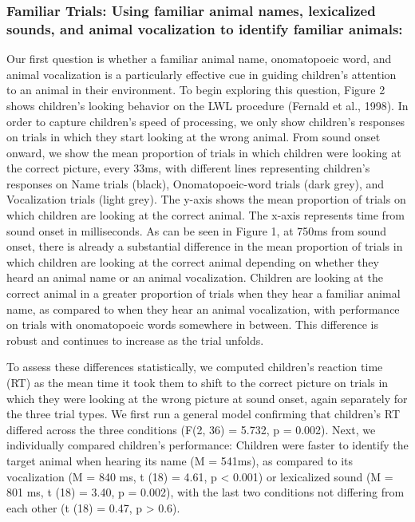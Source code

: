 \documentclass[english,floatsintext,man]{apa6}
\theoremstyle{definition}
\theoremstyle{definition}
\theoremstyle{definition}
\theoremstyle{remark}
\begin{document}
\subsubsection{Familiar Trials: Using familiar animal names, lexicalized
sounds, and animal vocalization to identify familiar
animals:}\label{familiar-trials-using-familiar-animal-names-lexicalized-sounds-and-animal-vocalization-to-identify-familiar-animals}

Our first question is whether a familiar animal name, onomatopoeic word,
and animal vocalization is a particularly effective cue in guiding
children's attention to an animal in their environment. To begin
exploring this question, Figure 2 shows children's looking behavior on
the LWL procedure (Fernald et al., 1998). In order to capture children's
speed of processing, we only show children's responses on trials in
which they start looking at the wrong animal. From sound onset onward,
we show the mean proportion of trials in which children were looking at
the correct picture, every 33ms, with different lines representing
children's responses on Name trials (black), Onomatopoeic-word trials
(dark grey), and Vocalization trials (light grey). The y-axis shows the
mean proportion of trials on which children are looking at the correct
animal. The x-axis represents time from sound onset in milliseconds. As
can be seen in Figure 1, at 750ms from sound onset, there is already a
substantial difference in the mean proportion of trials in which
children are looking at the correct animal depending on whether they
heard an animal name or an animal vocalization. Children are looking at
the correct animal in a greater proportion of trials when they hear a
familiar animal name, as compared to when they hear an animal
vocalization, with performance on trials with onomatopoeic words
somewhere in between. This difference is robust and continues to
increase as the trial unfolds.

To assess these differences statistically, we computed children's
reaction time (RT) as the mean time it took them to shift to the correct
picture on trials in which they were looking at the wrong picture at
sound onset, again separately for the three trial types. We first run a
general model confirming that children's RT differed across the three
conditions (F(2, 36) = 5.732, p = 0.002). Next, we individually compared
children's performance: Children were faster to identify the target
animal when hearing its name (M = 541ms), as compared to its
vocalization (M = 840 ms, t (18) = 4.61, p \textless{} 0.001) or
lexicalized sound (M = 801 ms, t (18) = 3.40, p = 0.002), with the last
two conditions not differing from each other (t (18) = 0.47, p
\textgreater{} 0.6).
\end{document}
